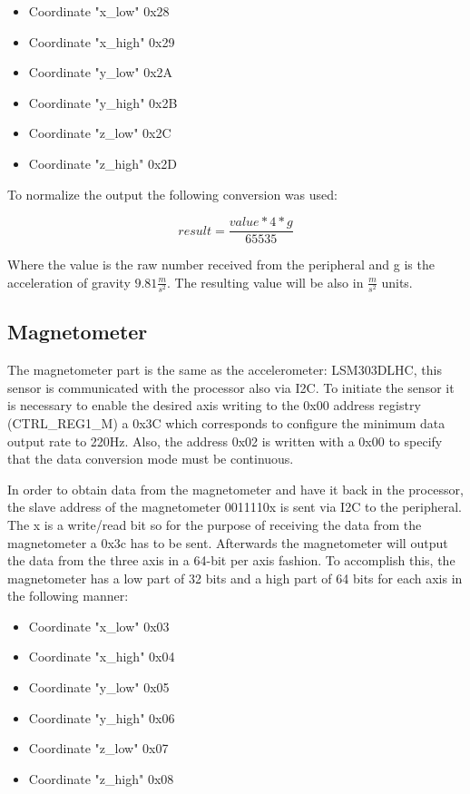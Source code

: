 \documentclass[12pt]{report}%
\begin{document}
\begin{itemize}
\item Coordinate "x\_low" 0x28
\item Coordinate "x\_high" 0x29
\item Coordinate "y\_low" 0x2A
\item Coordinate "y\_high" 0x2B
\item Coordinate "z\_low" 0x2C
\item Coordinate "z\_high" 0x2D
\end{itemize}

To normalize the output the following conversion was used:

\begin{equation} \label{eq:accelerometer}
	result = \frac{value * 4 * g}{65535}
\end{equation}

Where the value is the raw number received from the peripheral and g is the acceleration of gravity $9.81 \frac{m}{s^2}$. The resulting value will be also in $\frac{m}{s^2}$ units.

\subsection{Magnetometer}
The magnetometer part is the same as the accelerometer: LSM303DLHC\cite{accelerometerpart}, this sensor is communicated with the processor also via I2C. To initiate the sensor it is necessary to enable the desired axis writing to the 0x00 address registry (CTRL\_REG1\_M) a 0x3C which corresponds to configure the minimum data output rate to 220Hz. Also, the address 0x02 is written with a 0x00 to specify that the data conversion mode must be continuous.

In order to obtain data from the magnetometer and have it back in the processor, the slave address of the magnetometer 0011110x is sent via I2C to the peripheral. The x is a write/read bit so for the purpose of receiving the data from the magnetometer a 0x3c has to be sent. Afterwards the magnetometer will output the data from the three axis in a 64-bit per axis fashion. To accomplish this, the magnetometer has a low part of 32 bits and a high part of 64 bits for each axis in the following manner:

\begin{itemize}
\item Coordinate "x\_low" 0x03
\item Coordinate "x\_high" 0x04
\item Coordinate "y\_low" 0x05
\item Coordinate "y\_high" 0x06
\item Coordinate "z\_low" 0x07
\item Coordinate "z\_high" 0x08
\end{itemize}
\end{document}
